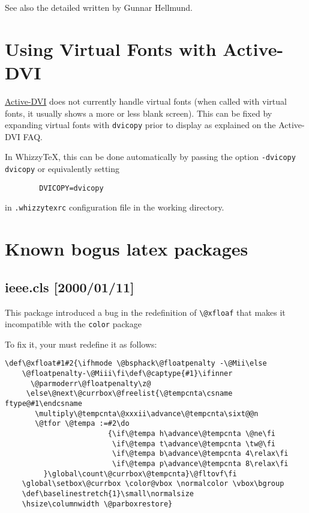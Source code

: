 \documentclass{article}
\def \WhizzyTeX{Whizzy\TeX}
\begin{document}
See also the detailed
 written by
{Gunnar Hellmund}.

\section{Using Virtual Fonts with Active-DVI}

\href{http://cristal.inria.fr/advi/}{Active-DVI}
does not currently handle virtual fonts (when called with virtual fonts, it
usually shows a more or less blank screen). This can be fixed by expanding
virtual fonts with \texttt{dvicopy} prior to display as explained on the
{Active-DVI} FAQ.

In {\WhizzyTeX}, this can be done automatically by passing the option
\texttt{-dvicopy dvicopy} or equivalently setting
\begin{verbatim}
        DVICOPY=dvicopy
\end{verbatim}
in \texttt{.whizzytexrc} configuration file in the working directory.

\section{Known bogus latex packages}

\subsection{ieee.cls [2000/01/11]}

This package introduced a bug in the redefinition of \verb"\@xfloaf" 
that makes it incompatible with the \texttt{color} package

To fix it, your must redefine it as follows:
{\small
\begin{verbatim}
\def\@xfloat#1#2{\ifhmode \@bsphack\@floatpenalty -\@Mii\else
    \@floatpenalty-\@Miii\fi\def\@captype{#1}\ifinner
      \@parmoderr\@floatpenalty\z@
     \else\@next\@currbox\@freelist{\@tempcnta\csname ftype@#1\endcsname
       \multiply\@tempcnta\@xxxii\advance\@tempcnta\sixt@@n
       \@tfor \@tempa :=#2\do
                        {\if\@tempa h\advance\@tempcnta \@ne\fi
                         \if\@tempa t\advance\@tempcnta \tw@\fi
                         \if\@tempa b\advance\@tempcnta 4\relax\fi
                         \if\@tempa p\advance\@tempcnta 8\relax\fi
         }\global\count\@currbox\@tempcnta}\@fltovf\fi
    \global\setbox\@currbox \color@vbox \normalcolor \vbox\bgroup
    \def\baselinestretch{1}\small\normalsize
    \hsize\columnwidth \@parboxrestore}
\end{verbatim}}
\end{document}

